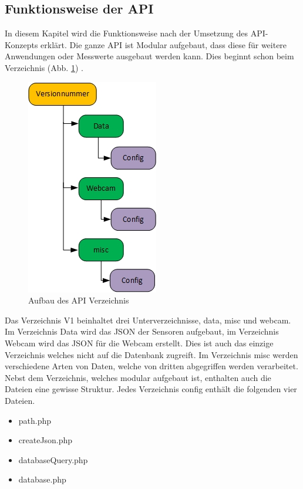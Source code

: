 \subsection{Funktionsweise der API}

In diesem Kapitel wird die Funktionsweise nach der Umsetzung des API-Konzepts erklärt. Die ganze API ist Modular aufgebaut, dass diese für weitere Anwendungen oder Messwerte ausgebaut werden kann. Dies beginnt schon beim Verzeichnis (Abb. \ref{img:APIVerzeichnis}) .


\begin{figure}[h!]
	\centering
	\includegraphics[width=0.3\linewidth]{img/APIVerzeichnis.jpg}
	\caption{Aufbau des API Verzeichnis}
	\label{img:APIVerzeichnis}
\end{figure}

Das Verzeichnis V1 beinhaltet drei Unterverzeichnisse, data, misc und webcam. Im Verzeichnis Data wird das JSON der Sensoren aufgebaut, im Verzeichnis Webcam wird das JSON für die Webcam erstellt. Dies ist auch das einzige Verzeichnis welches nicht auf die Datenbank zugreift. Im Verzeichnis misc werden verschiedene Arten von Daten, welche von dritten abgegriffen werden verarbeitet. Nebst dem Verzeichnis, welches modular aufgebaut ist, enthalten auch die Dateien eine gewisse Struktur. Jedes Verzeichnis config enthält die folgenden vier Dateien. 
\begin{itemize}
\item path.php
\item createJson.php
\item databaseQuery.php
\item database.php
\end{itemize}

